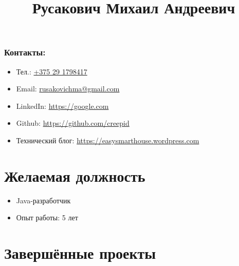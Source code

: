 \documentclass[a4paper, 12pt]{article}
\title{Русакович Михаил Андреевич}
\author{}
\date{}
\begin{document}
\maketitle

\subsubsection*{Контакты:}
\begin{itemize}
    \item Тел.: \href{tel:+375291798417}{+375 29 1798417}
    \item Email: \href{mailto:rusakovichma@gmail.com}{rusakovichma@gmail.com}
    \item LinkedIn: \href{https://google.com}{https://google.com}
    \item Github: \href{https://github.com/creepid}{https://github.com/creepid}
    \item Технический блог: \href{https://easysmarthouse.wordpress.com}{https://easysmarthouse.wordpress.com}
\end{itemize}


\section*{Желаемая должность}

    \begin{itemize}
        \item Java-разработчик
        \item Опыт работы: 5 лет
    \end{itemize}


\section*{Завершённые проекты}
\end{document}
